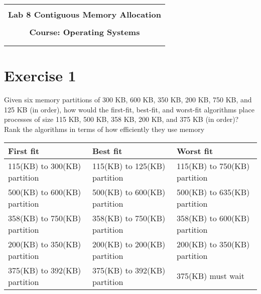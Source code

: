 \documentclass[11pt]{article}
\begin{document}
\begin{flushleft}
    \begin{tabular}{c}
        \\ \\ \hline \\
        \multicolumn{1}{l}{\textbf{{\Huge Lab 8 Contiguous Memory Allocation}}}		
        \\ \\
        \textbf{{\Huge Course: Operating Systems}}		            
        \\ \\ \hline \\
    \end{tabular}
\end{flushleft}


\vspace{0.5cm}

\section*{Exercise 1}
Given six memory partitions of 300 KB, 600 KB, 350 KB, 200 KB, 750 KB, and 125
KB (in order), how would the first-fit, best-fit, and worst-fit algorithms place processes
of size 115 KB, 500 KB, 358 KB, 200 KB, and 375 KB (in order)? Rank the algorithms
in terms of how efficiently they use memory

\begin{table}[!htp]
    \centering
    \def\arraystretch{1.6}

    \begin{tabular}{|l|l|l|}
        \hline
        First fit                    & Best fit                     & Worst fit                    \\ \hline
        115(KB) to 300(KB) partition & 115(KB) to 125(KB) partition & 115(KB) to 750(KB) partition \\ \hline
        500(KB) to 600(KB) partition & 500(KB) to 600(KB) partition & 500(KB) to 635(KB) partition \\ \hline
        358(KB) to 750(KB) partition & 358(KB) to 750(KB) partition & 358(KB) to 600(KB) partition \\ \hline
        200(KB) to 350(KB) partition & 200(KB) to 200(KB) partition & 200(KB) to 350(KB) partition \\ \hline
        375(KB) to 392(KB) partition & 375(KB) to 392(KB) partition & 375(KB) must wait            \\ \hline
    \end{tabular}
\end{table}
\end{document}
